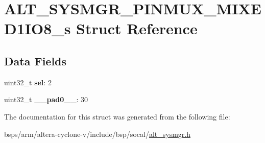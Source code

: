 \hypertarget{structALT__SYSMGR__PINMUX__MIXED1IO8__s}{}\section{A\+L\+T\+\_\+\+S\+Y\+S\+M\+G\+R\+\_\+\+P\+I\+N\+M\+U\+X\+\_\+\+M\+I\+X\+E\+D1\+I\+O8\+\_\+s Struct Reference}
\label{structALT__SYSMGR__PINMUX__MIXED1IO8__s}
\subsection*{Data Fields}
\begin{DoxyCompactItemize}
\item 
\mbox{\label{structALT__SYSMGR__PINMUX__MIXED1IO8__s_a49429793b4dfd8c749b0a914ff00d26d}} 
uint32\+\_\+t {\bfseries sel}\+: 2
\item 
\mbox{\label{structALT__SYSMGR__PINMUX__MIXED1IO8__s_a44f45c6e767a396a5b58d6f310fd1b5c}} 
uint32\+\_\+t {\bfseries \+\_\+\+\_\+pad0\+\_\+\+\_\+}\+: 30
\end{DoxyCompactItemize}


The documentation for this struct was generated from the following file\+:\begin{DoxyCompactItemize}
\item 
bsps/arm/altera-\/cyclone-\/v/include/bsp/socal/\mbox{\hyperlink{alt__sysmgr_8h}{alt\+\_\+sysmgr.\+h}}\end{DoxyCompactItemize}
